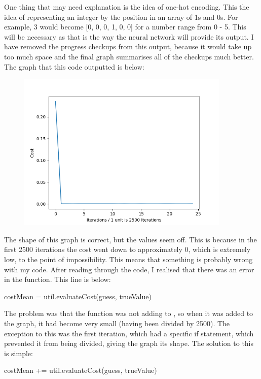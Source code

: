 \documentclass{report}
\begin{document}
\noindent One thing that may need explanation is the idea of one-hot encoding. This the idea of representing an integer by the position in an array of 1s and 0s. For example, 3 would become [0, 0, 0, 1, 0, 0] for a number range from 0 - 5. This will be necessary as that is the way the neural network will provide its output.
\newline
I have removed the progress checkups from this output, because it would take up too much space and the final graph summarises all of the checkups much better. The graph that this code outputted is below:
\begin{figure}[H]
    \centering
    \includegraphics[width = 4in]{Images/Development and Testing/Stage 3/Small Numbers Training Curve.png}
    \label{fig:Small Numbers Cost Graph}
\end{figure}
\noindent The shape of this graph is correct, but the values seem off. This is because in the first 2500 iterations the cost went down to approximately 0, which is extremely low, to the point of impossibility. This means that something is probably wrong with my code. 
\newline
After reading through the code, I realised that there was an error in the  function. This line is below: 
\begin{python}
costMean = util.evaluateCost(guess, trueValue)
\end{python}
The problem was that the function was not adding to , so when it was added to the graph, it had become very small (having been divided by 2500). The exception to this was the first iteration, which had a specific if statement, which prevented it from being divided, giving the graph its shape. The solution to this is simple:
\begin{python}
costMean += util.evaluateCost(guess, trueValue)
\end{python}
\end{document}
